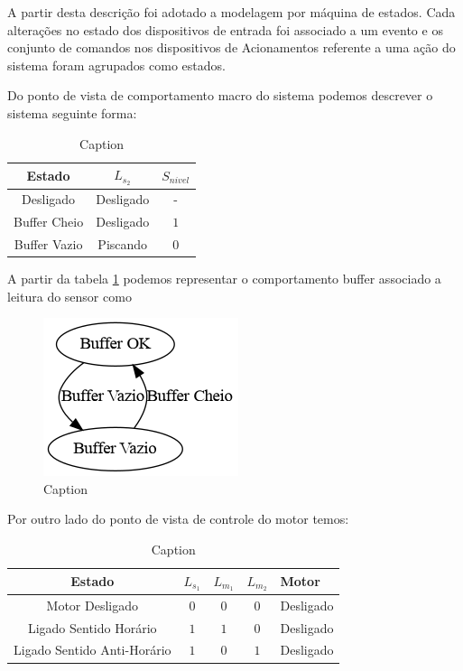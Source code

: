 \documentclass[a4paper,11pt]{article}
\begin{document}
A partir desta descrição foi adotado a modelagem por máquina de estados. Cada alterações no estado dos dispositivos de entrada foi associado a um evento e os conjunto de comandos nos dispositivos de Acionamentos referente a uma ação do sistema foram agrupados como estados.

Do ponto de vista de comportamento macro do sistema podemos descrever o sistema seguinte forma:

\begin{table}[H]
    \centering
    \begin{tabular}{c|cc}
        \hline
        Estado & $L_{s_2}$ & $S_{nivel}$ \\
        \hline
        Desligado & Desligado & - \\
        Buffer Cheio & Desligado & $1$\\
        Buffer Vazio & Piscando & $0$\\
        \hline
    \end{tabular}
    \caption{Caption}
    \label{tab:states_buffer}
\end{table}

A partir da tabela \ref{tab:states_buffer} podemos representar o comportamento buffer associado a leitura do sensor como

\begin{figure}[H]
    \centering
    \includegraphics[width=0.6\linewidth]{src/tex/img/automato_buffer.png}
    \caption{Caption}
    \label{fig:automato_buffer}
\end{figure}

Por outro lado do ponto de vista de controle do motor temos:

\begin{table}[H]
    \centering
    \begin{tabular}{c|cccl}
        \hline
        Estado & $L_{s_1}$ & $L_{m_1}$ & $L_{m_2}$ & Motor \\
        \hline
        Motor Desligado & $0$ & $0$ & $0$ & Desligado\\
        Ligado Sentido Horário & $1$ & $1$ & $0$ & Desligado\\
        Ligado Sentido Anti-Horário & $1$ & $0$ & $1$ & Desligado\\
        \hline
    \end{tabular}
    \caption{Caption}
    \label{tab:states_motor}
\end{table}
\end{document}
